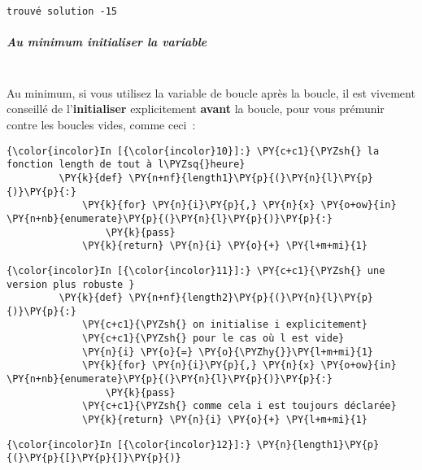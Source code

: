     \begin{Verbatim}[commandchars=\\\{\}]
trouvé solution -15

    \end{Verbatim}

    \hypertarget{au-minimum-initialiser-la-variable}{%
\subparagraph{Au minimum initialiser la
variable\\\\}\label{au-minimum-initialiser-la-variable}}

    Au minimum, si vous utilisez la variable de boucle après la boucle, il
est vivement conseillé de l'\textbf{initialiser} explicitement
\textbf{avant} la boucle, pour vous prémunir contre les boucles vides,
comme ceci~:

    \begin{Verbatim}[commandchars=\\\{\}]
{\color{incolor}In [{\color{incolor}10}]:} \PY{c+c1}{\PYZsh{} la fonction length de tout à l\PYZsq{}heure}
         \PY{k}{def} \PY{n+nf}{length1}\PY{p}{(}\PY{n}{l}\PY{p}{)}\PY{p}{:}
             \PY{k}{for} \PY{n}{i}\PY{p}{,} \PY{n}{x} \PY{o+ow}{in} \PY{n+nb}{enumerate}\PY{p}{(}\PY{n}{l}\PY{p}{)}\PY{p}{:}
                 \PY{k}{pass}
             \PY{k}{return} \PY{n}{i} \PY{o}{+} \PY{l+m+mi}{1}
\end{Verbatim}


    \begin{Verbatim}[commandchars=\\\{\}]
{\color{incolor}In [{\color{incolor}11}]:} \PY{c+c1}{\PYZsh{} une version plus robuste }
         \PY{k}{def} \PY{n+nf}{length2}\PY{p}{(}\PY{n}{l}\PY{p}{)}\PY{p}{:}
             \PY{c+c1}{\PYZsh{} on initialise i explicitement}
             \PY{c+c1}{\PYZsh{} pour le cas où l est vide}
             \PY{n}{i} \PY{o}{=} \PY{o}{\PYZhy{}}\PY{l+m+mi}{1}
             \PY{k}{for} \PY{n}{i}\PY{p}{,} \PY{n}{x} \PY{o+ow}{in} \PY{n+nb}{enumerate}\PY{p}{(}\PY{n}{l}\PY{p}{)}\PY{p}{:}
                 \PY{k}{pass}
             \PY{c+c1}{\PYZsh{} comme cela i est toujours déclarée}
             \PY{k}{return} \PY{n}{i} \PY{o}{+} \PY{l+m+mi}{1}
\end{Verbatim}


    \begin{Verbatim}[commandchars=\\\{\}]
{\color{incolor}In [{\color{incolor}12}]:} \PY{n}{length1}\PY{p}{(}\PY{p}{[}\PY{p}{]}\PY{p}{)}
\end{Verbatim}


